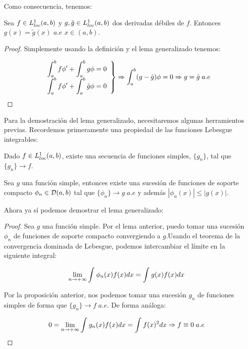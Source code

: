 Como consecuencia, tenemos:

\begin{coro}
Sea $f\in L^1_{loc}(a,b)$ y $g,\tilde{g}\in L^1_{loc}(a,b)$ dos derivadas débiles de $f$. Entonces $g(x)=\tilde{g}(x)$ $a.e$ $x\in(a,b)$.
\end{coro}

\begin{proof}
Simplemente usando la definición y el lema generalizado tenemos:

\[
\left.
\begin{array}{c}
\displaystyle\int_{ a }^{ b } f\phi'+\displaystyle\int_{ a }^{ b } g\phi=0 \\
\displaystyle\int_{ a }^{ b } f\phi'+\displaystyle\int_{ a }^{ b } \tilde{g}\phi=0
\end{array}
\right\} \Rightarrow \displaystyle\int_{ a }^{ b } (g-\tilde{g})\phi=0 \Rightarrow g=\tilde{g} \; a.e
\]
\end{proof}

Para la demostración del lema generalizado, necesitaremos algunas herramientos previas. Recordemos primeramente una propiedad de las funciones Lebesgue integrables:

\begin{prop}
Dado $f\in L^1_{loc}(a,b)$, existe una secuencia de funciones simples, $\{g_n\}$, tal que $\{g_n\}\longrightarrow f$.
\end{prop}

\begin{lemma}
Sea $g$ una función simple, entonces existe una sucesión de funciones de soporte compacto $\phi_n\in\mathcal{D}(a,b)$ tal que $\{\phi_n\}\longrightarrow g \; a.e$ y además $|\phi_n(x)|\leq|g(x)|$.
\end{lemma}

Ahora ya sí podemos demostrar el lema generalizado:

\begin{proof}
Sea $g$ una función simple. Por el lema anterior, puedo tomar una sucesión $\phi_n$ de funciones de soporte compacto convergiendo a $g$.Usando el teorema de la convergencia dominada de Lebesgue, podemos intercambiar el límite en la siguiente integral:

\[
\displaystyle\lim_{  n  \to +\infty }  \displaystyle\int_{  }^{  } \phi_n(x)f(x)dx =\displaystyle\int_{  }^{  } g(x)f(x)dx
\]

Por la proposición anterior, nos podemos tomar una sucesión $g_n$ de funciones simples de forma que $\{g_n\}\longrightarrow f \; a.e$. De forma análoga:

\[
0=\displaystyle\lim_{  n  \to +\infty }  \displaystyle\int_{  }^{  } g_n(x)f(x)dx =\displaystyle\int_{  }^{  } f(x)^2dx \Rightarrow f\equiv 0 \; a.e
\]

\end{proof}

